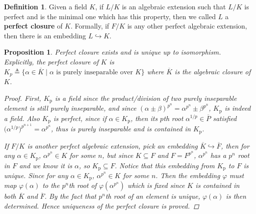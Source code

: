 \documentclass[a4paper]{article}
\newcommand{\defeq}{\triangleq}
\theoremstyle{remark}
\theoremstyle{definition}
\theoremstyle{definition}
\newtheorem{definition}{Definition}
\theoremstyle{plain}
\newtheorem{proposition}{Proposition}
\begin{document}
  \begin{definition}
    Given a field $K$, if $L/K$ is an algebraic extension such that $L/K$ is perfect
    and is the minimal one which has this property, then we called $L$ a {\bf perfect closure} of $K$.
    Formally, if $F/K$ is any other perfect algebraic extension, then there is an embedding $L \hookrightarrow K$.
  \end{definition}

  \begin{proposition} \label{prop:perfect-closure-exists}
    Perfect closure exists and is unique up to isomorphism. Explicitly, the perfect closure of $K$ is
    $K_p \defeq \{ \alpha \in \overline{K} \mid \alpha \text{ is purely inseparable over } K \}$
    where $\overline{K}$ is the algebraic closure of $K$.

    \begin{proof}
      First, $K_\text{p}$ is a field since the product/division of two purely inseparable element
      is still purely inseparable, and since $(\alpha \pm \beta)^{p^n} = \alpha^{p^n} \pm \beta^{p^n}$,
      $K_\text{p}$ is indeed a field. Also $K_\text{p}$ is perfect, since if $\alpha \in K_\text{p}$,
      then its $p$th root $\alpha^{1/p} \in \overline{P}$ satisfied $\big(\alpha^{1/p}\big)^{p^{n+1}} =
      \alpha^{p^n}$, thus is purely inseparable and is contained in $K_\text{p}$.

      If $F/K$ is another perfect algebraic extension, pick an embedding
      $\overline{K} \hookrightarrow \overline{F}$, then for any $\alpha \in K_\text{p}$,
      $\alpha^{p^n} \in K$ for some $n$, but since $K \subseteq F$ and $F = F^{p^n}$, $\alpha^{p^n}$
      has a $p^n$ root in $F$ and we know it is $\alpha$, so $K_\text{p} \subseteq F$.
      Notice that this embedding from $K_\text{p}$ to $F$ is unique. Since
      for any $\alpha \in K_\text{p}$, $\alpha^{p^n} \in K$ for some $n$.
      Then the embedding $\varphi$ must map $\varphi(\alpha)$ to the $p^n$th root of $\varphi(\alpha^{p^n})$
      which is fixed since $K$ is contained in both $\overline{K}$ and $\overline{F}$.
      By the fact that $p^n$th root of an element is unique, $\varphi(\alpha)$ is then determined.
      Hence uniqueness of the perfect closure is proved.
    \end{proof}
  \end{proposition}
\end{document}
